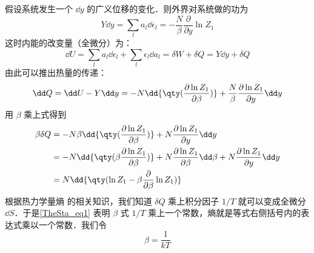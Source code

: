 假设系统发生一个 $\dd y$ 的广义位移的变化．则外界对系统做的功为
\begin{equation}
Y\dd y=\sum_l a_l\dd \epsilon_l=-\frac{N}{\beta}\frac{\partial }{\partial y}\ln Z_1
\end{equation}
这时内能的改变量（全微分）为：
\begin{equation}
\dd U=\sum_l a_l\dd \epsilon_l+\sum_l\epsilon_l\dd a_l=\delta W+\delta Q=Y\dd y+\delta Q
\end{equation}
由此可以推出热量的传递：
\begin{equation}
\dd Q=\dd U-Y\dd y=
-N\dd{\qty(\frac{\partial \ln Z_1}{\partial \beta})}+\frac{N}{\beta}\frac{\partial \ln Z_1}{\partial y}\dd y
\end{equation}
用 $\beta$ 乘上式得到
\begin{equation}\label{TheSta_eq1}
\begin{aligned}
\beta \delta Q&=-N\beta\dd{\qty(\frac{\partial \ln Z_1}{\partial \beta})}+N\frac{\partial \ln Z_1}{\partial y}\dd y\\
&=-N\dd{\qty(\beta\frac{\partial \ln Z_1}{\partial \beta})}+N\frac{\partial \ln Z_1}{\partial \beta}\dd \beta+N\frac{\partial \ln Z_1}{\partial y}\dd y\\
&=N\dd{\qty(\ln Z_1-\beta\frac{\partial }{\partial \beta}\ln Z_1)}
\end{aligned}
\end{equation}
根据热力学量熵 的相关知识，我们知道 $\delta Q$ 乘上积分因子 $1/T$ 就可以变成全微分 $\dd S$．于是\autoref{TheSta_eq1} 表明 $\beta$ 式 $1/T$ 乘上一个常数，熵就是等式右侧括号内的表达式乘以一个常数．我们令
\begin{equation}
\beta=\frac{1}{kT}
\end{equation}

